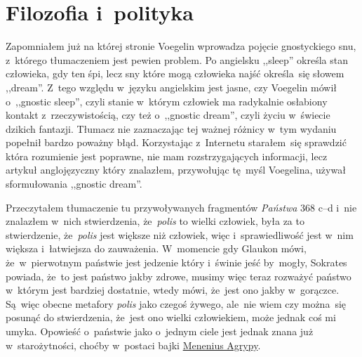 \documentclass[a4paper,11pt]{article}
\begin{document}
\newpage
\section{Filozofia i~polityka}

\vspace{\spaceTwo}






\start Zapomniałem już na której stronie Voegelin wprowadza pojęcie
gnostyckiego snu, z~którego tłumaczeniem jest pewien problem. Po
angielsku ,,sleep'' określa stan człowieka, gdy ten śpi, lecz sny
które mogą człowieka najść określa~się słowem ,,dream''. Z~tego
względu w~języku angielskim jest jasne, czy Voegelin mówił o~,,gnostic
sleep'', czyli stanie w~którym człowiek ma radykalnie osłabiony
kontakt z~rzeczywistością, czy też o~,,gnostic dream'', czyli życiu
w~świecie dzikich fantazji. Tłumacz nie zaznaczając tej ważnej różnicy
w~tym wydaniu popełnił bardzo poważny błąd. Korzystając z~Internetu
starałem~się sprawdzić która rozumienie jest poprawne, nie mam
rozstrzygających informacji, lecz artykuł anglojęzyczny który
znalazłem, przywołując tę~myśl Voegelina, używał sformułowania
,,gnostic dream''.

\vspace{\spaceFour}


\start {} Przeczytałem tłumaczenie tu przywoływanych fragmentów
\emph{Państwa} 368 c--d i~nie znalazłem w~nich stwierdzenia,
że~\emph{polis} to wielki człowiek, była za to stwierdzenie,
że~\emph{polis} jest większe niż człowiek, więc i~sprawiedliwość jest
w~nim większa i~łatwiejsza do zauważenia. W~momencie gdy Glaukon mówi,
że~w~pierwotnym państwie jest jedzenie który i~świnie jeść by~mogły,
Sokrates powiada, że~to jest państwo jakby zdrowe, musimy więc teraz
rozważyć państwo w~którym jest bardziej dostatnie, wtedy mówi, że~jest
ono jakby w~gorączce. Są~więc obecne metafory \emph{polis} jako czegoś
żywego, ale~nie wiem czy można~się posunąć do stwierdzenia, że~jest
ono wielki człowiekiem, może jednak coś mi umyka. Opowieść o~państwie
jako o~jednym ciele jest jednak znana już w~starożytności, choćby
w~postaci bajki
\href{https://en.wikipedia.org/wiki/Agrippa_Menenius_Lanatus_(consul_503_BC)}
{Menenius Agrypy}.
\end{document}
